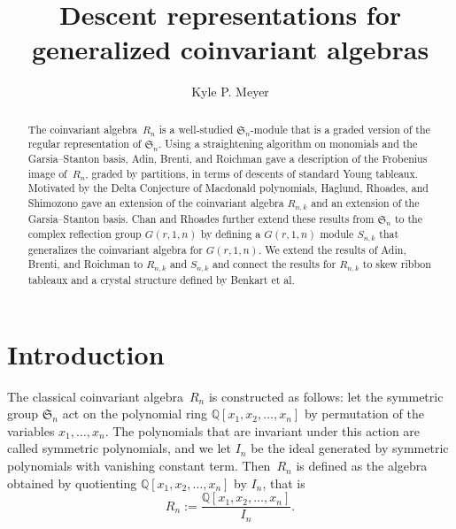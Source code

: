 \documentclass[10pt]{article}
\author{Kyle P. Meyer}
\title{Descent representations for generalized coinvariant algebras}
\newcommand{\coloneqq}{:=}
\begin{document}
\maketitle
\begin{abstract}
The coinvariant algebra~$R_n$ is a well-studied $\mathfrak{S}_n$-module that is a graded version of the regular representation of $\mathfrak{S}_n$. Using a straightening algorithm on monomials and the Garsia--Stanton basis, Adin, Brenti, and Roichman gave a description of the Frobenius image of~$R_n$, graded by partitions, in terms of descents of standard Young tableaux. Motivated by the Delta Conjecture of Macdonald polynomials, Haglund, Rhoades, and Shimozono gave an extension of the coinvariant algebra $R_{n,k}$ and an extension of the Garsia--Stanton basis. Chan and Rhoades further extend these results from $\mathfrak{S}_n$ to the complex reflection group $G(r,1,n)$ by defining a $G(r,1,n)$ module $S_{n,k}$ that generalizes the coinvariant algebra for $G(r,1,n)$. We extend the results of Adin, Brenti, and Roichman to $R_{n,k}$ and $S_{n,k}$ and connect the results for $R_{n,k}$ to skew ribbon tableaux and a crystal structure defined by Benkart et al.
\end{abstract}








\maketitle

\section{Introduction}


The classical coinvariant algebra~$R_n$ is constructed as follows: let the symmetric group $\mathfrak{S}_n$ act on the 
polynomial ring $\mathbb{Q}[x_1,x_2,\ldots, x_n]$ by permutation of the variables $x_1,\ldots, x_n$. The polynomials that are 
invariant under this action are called symmetric polynomials, and we let $I_n$ be the ideal generated by symmetric polynomials 
with vanishing constant term. Then~$R_n$ is defined as the algebra obtained by quotienting $\mathbb{Q}[x_1,x_2,\ldots, x_n]$ 
by $I_n$, that is 
\begin{equation}
R_n\coloneqq \frac{\mathbb{Q}[x_1,x_2,\ldots,x_n]}{I_n}.
\end{equation}
\end{document}
